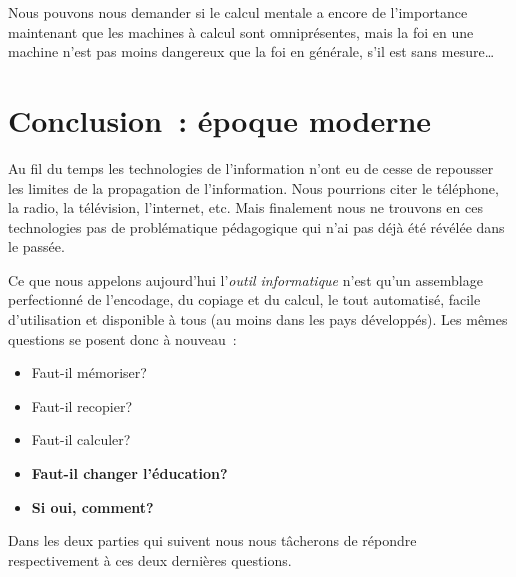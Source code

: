 Nous pouvons nous demander si le calcul mentale a encore de l'importance maintenant que les machines à calcul sont omniprésentes, mais la foi en une machine n'est pas moins dangereux que la foi en générale, s'il est sans mesure\ldots


\chapter*{Conclusion~: époque moderne}

Au fil du temps les technologies de l'information n'ont eu de cesse de repousser les limites de la propagation de l'information. Nous pourrions citer le téléphone, la radio, la télévision, l'internet, etc. Mais finalement nous ne trouvons en ces technologies pas de problématique pédagogique qui n'ai pas déjà été révélée dans le passée.

Ce que nous appelons aujourd'hui l'\emph{outil informatique} n'est qu'un assemblage perfectionné de l'encodage, du copiage et du calcul, le tout automatisé, facile d'utilisation et disponible à tous (au moins dans les pays développés). Les mêmes questions se posent donc à nouveau~:

\begin{itemize}
\Large
\item Faut-il mémoriser?

\item Faut-il recopier?

\item Faut-il calculer?

\item \textbf{Faut-il changer l'éducation?}

\item \textbf{Si oui, comment?}

\end{itemize}

Dans les deux parties qui suivent nous nous tâcherons de répondre respectivement à ces deux dernières questions.